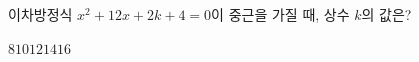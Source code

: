 이차방정식 $x^2+12x+2k+4=0$이 중근을 가질 때, 상수 $k$의 값은?
\begin{choices32}{$8$}{$10$}{$12$}{$14$}{$16$}\end{choices32}
